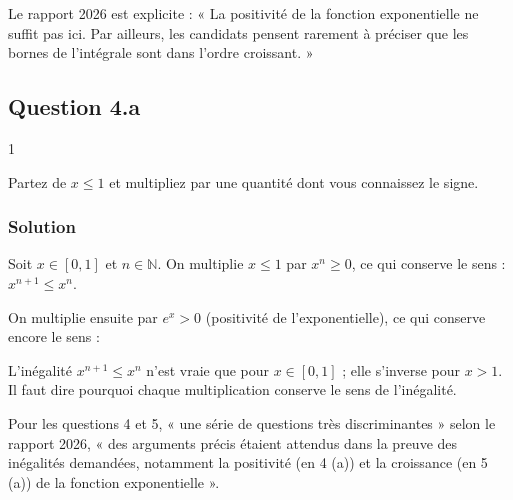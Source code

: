 \documentclass[11pt,a4paper]{article}
\newcommand{\equationajustee}[1]{%
  \sbox{\boiteequation}{$\displaystyle #1$}%
  \ifdim\wd\boiteequation>\linewidth
    \[\resizebox{\linewidth}{!}{\usebox{\boiteequation}}\]%
  \else
    \[#1\]%
  \fi}
\begin{document}
\begin{jury}

Le rapport 2026 est explicite : « La positivité de la fonction exponentielle ne suffit pas ici. Par ailleurs, les candidats pensent rarement à préciser que les bornes de l'intégrale sont dans l'ordre croissant. »

\end{jury}

\hypertarget{question-4.a}{%
\subsection{Question 4.a}\label{question-4.a}}

\begin{indication}{1}

Partez de \(x\le1\) et multipliez par une quantité dont vous connaissez le signe.

\end{indication}

\hypertarget{solution-14}{%
\subsubsection{Solution}\label{solution-14}}

Soit \(x\in[0,1]\) et \(n\in\mathbb N\). On multiplie \(x\le1\) par \(x^n\ge0\), ce qui conserve le sens : \(x^{n+1}\le x^n\).

On multiplie ensuite par \(e^x>0\) (positivité de l'exponentielle), ce qui conserve encore le sens :

\equationajustee{\boxed{x^{n+1}\le x^n\ \text{ et }\ x^{n+1}e^x\le x^ne^x.}}

\begin{piege}

L'inégalité \(x^{n+1}\le x^n\) n'est vraie que pour \(x\in[0,1]\) ; elle s'inverse pour \(x>1\). Il faut dire pourquoi chaque multiplication conserve le sens de l'inégalité.

\end{piege}

\begin{jury}

Pour les questions 4 et 5, « une série de questions très discriminantes » selon le rapport 2026, « des arguments précis étaient attendus dans la preuve des inégalités demandées, notamment la positivité (en 4 (a)) et la croissance (en 5 (a)) de la fonction exponentielle ».

\end{jury}
\end{document}
